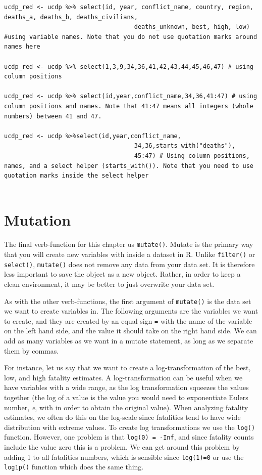 \documentclass[
]{book}
\begin{document}
\begin{verbatim}
ucdp_red <- ucdp %>% select(id, year, conflict_name, country, region,                                             deaths_a, deaths_b, deaths_civilians,
                                    deaths_unknown, best, high, low) #using variable names. Note that you do not use quotation marks around names here
                                    
ucdp_red <- ucdp %>% select(1,3,9,34,36,41,42,43,44,45,46,47) # using column positions     

ucdp_red <- ucdp %>% select(id,year,conflict_name,34,36,41:47) # using column positions and names. Note that 41:47 means all integers (whole numbers) between 41 and 47.

ucdp_red <- ucdp %>%select(id,year,conflict_name,
                                    34,36,starts_with("deaths"),
                                    45:47) # Using column positions, names, and a select helper (starts_with()). Note that you need to use quotation marks inside the select helper
                                  
\end{verbatim}

\hypertarget{mutation}{%
\section{Mutation}\label{mutation}}

The final verb-function for this chapter us \texttt{mutate()}. Mutate is the primary way that you will create new variables with inside a dataset in R. Unlike \texttt{filter()} or \texttt{select()}, \texttt{mutate()} does not remove any data from your data set. It is therefore less important to save the object as a new object. Rather, in order to keep a clean environment, it may be better to just overwrite your data set.

As with the other verb-functions, the first argument of \texttt{mutate()} is the data set we want to create variables in. The following arguments are the variables we want to create, and they are created by an equal sign \texttt{=} with the name of the variable on the left hand side, and the value it should take on the right hand side. We can add as many variables as we want in a mutate statement, as long as we separate them by commas.

For instance, let us say that we want to create a log-transformation of the best, low, and high fatality estimates. A log-transformation can be useful when we have variables with a wide range, as the log transformation squeezes the values together (the log of a value is the value you would need to exponentiate Eulers number, \emph{e}, with in order to obtain the original value). When analyzing fatality estimates, we often do this on the log-scale since fatalities tend to have wide distribution with extreme values. To create log transformations we use the \texttt{log()} function. However, one problem is that \texttt{log(0)\ =\ -Inf}, and since fatality counts include the value zero this is a problem. We can get around this problem by adding 1 to all fatalities numbers, which is sensible since \texttt{log(1)=0} or use the \texttt{log1p()} function which does the same thing.
\end{document}
